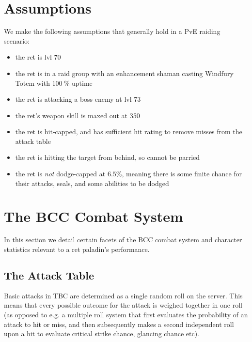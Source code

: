 \documentclass[letterpaper,11pt]{article}
\begin{document}
	\section{Assumptions}
	We make the following assumptions that generally hold in a PvE raiding scenario:
	\begin{itemize}
		\item the ret is lvl 70
		\item the ret is in a raid group with an enhancement shaman casting Windfury Totem with $100~\%$ uptime
		\item the ret is attacking a boss enemy at lvl 73
		\item the ret's weapon skill is maxed out at 350
		\item the ret is hit-capped, and has sufficient hit rating to remove misses from the attack table
		\item the ret is hitting the target from behind, so cannot be parried
		\item the ret is \emph{not} dodge-capped at $6.5\%$, meaning there is some finite chance for their attacks, seals, and some abilities to be dodged 
	\end{itemize}
	
	\section{The BCC Combat System}
	In this section we detail certain facets of the BCC combat system and character statistics relevant to a ret paladin's performance.
	
	\subsection{The Attack Table}
	Basic attacks in TBC are determined as a single random roll on the server.
	This means that every possible outcome for the attack is weighed together in one roll (as opposed to e.g. a multiple roll system that first evaluates the probability of an attack to
	hit or miss, and then subsequently makes a second independent roll upon a hit to evaluate critical strike chance, glancing chance etc).
	
\end{document}
